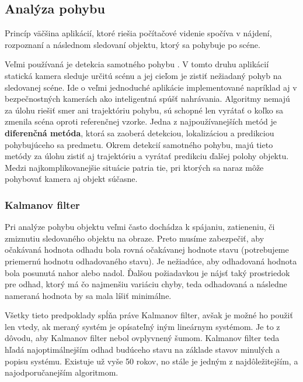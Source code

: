 \subsection{Analýza pohybu }
Princíp väčšina aplikácií, ktoré riešia počítačové videnie spočíva v nájdení, rozpoznaní a následnom sledovaní objektu, ktorý sa pohybuje po scéne. 

Veľmi používaná je detekcia samotného pohybu \cite{pocitacove_videnie_v_praxi}. V tomto druhu aplikácií statická kamera sleduje určitú scénu a jej cieľom je zistiť nežiadaný pohyb na sledovanej scéne. Ide o veľmi jednoduché aplikácie implementované napríklad aj v bezpečnostných kamerách ako inteligentná spúšť nahrávania. Algoritmy nemajú za úlohu riešiť smer ani trajektóriu pohybu, sú schopné len vyrátať o koľko sa zmenila scéna oproti referenčnej vzorke. Jedna z najpoužívanejších metód je \textbf{diferenčná metóda}, ktorá sa zaoberá detekciou, lokalizáciou a predikciou pohybujúceho sa predmetu. Okrem detekcií samotného pohybu, majú tieto metódy za úlohu zistiť aj trajektóriu a vyrátať predikciu ďalšej polohy objektu. Medzi najkomplikovanejšie situácie patria tie, pri ktorých sa naraz môže pohybovať kamera aj objekt súčasne. \cite{pocitacove_videnie_v_praxi}

\subsubsection{Kalmanov filter}
\label{sec:kalman}
Pri analýze pohybu objektu veľmi často dochádza k spájaniu, zatieneniu, či zmiznutiu sledovaného objektu na obraze. Preto musíme zabezpečiť, aby očakávaná hodnota odhadu bola rovná očakávanej hodnote stavu (potrebujeme priemernú hodnotu odhadovaného stavu). Je nežiadúce, aby odhadovaná hodnota bola posunutá nahor alebo nadol. Ďalšou požiadavkou je nájsť taký prostriedok pre odhad, ktorý má čo najmenšiu variáciu chyby, teda odhadovaná a následne nameraná hodnota by sa mala líšiť minimálne. \cite{Kalman_web} 

Všetky tieto predpoklady spĺňa práve Kalmanov filter, avšak je možné ho použiť len vtedy, ak  meraný systém je opísateľný iným lineárnym systémom. Je to z dôvodu, aby Kalmanov filter nebol ovplyvnený šumom. Kalmanov filter teda hľadá najoptimálnejším odhad budúceho stavu na základe stavov minulých a popisu systému. Existuje už vyše 50 rokov, no stále je jedným z najdôležitejším, a najodporučanejším algoritmom. \cite{Kalman_web}

